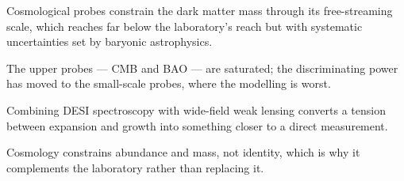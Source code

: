 \begin{keytakeaways}
\item Cosmological probes constrain the dark matter mass through its
free-streaming scale, which reaches far below the laboratory's reach but
with systematic uncertainties set by baryonic astrophysics.
\item The upper probes --- CMB and BAO --- are saturated; the discriminating
power has moved to the small-scale probes, where the modelling is worst.
\item Combining DESI spectroscopy with wide-field weak lensing converts a
tension between expansion and growth into something closer to a direct
measurement.
\item Cosmology constrains abundance and mass, not identity, which is why it
complements the laboratory rather than replacing it.
\end{keytakeaways}
